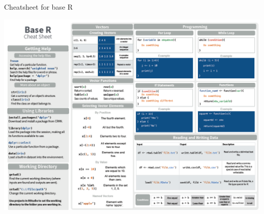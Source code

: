 \documentclass[
  ignorenonframetext,
]{beamer}
\begin{document}
\begin{frame}{Cheatsheet for base R}
\protect\hypertarget{cheatsheet-for-base-r}{}

\includegraphics{../external/images/r_cheatsheet_base.PNG}

\end{frame}
\end{document}
